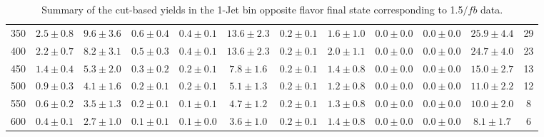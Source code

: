 \begin{table}
{\begin{center}
\begin{tabular}{l c c c c c c c c c c c }
350 & $2.5\pm0.8$ & $9.6\pm3.6$ & $0.6\pm0.4$ & $0.4\pm0.1$ & $13.6\pm2.3$ & $0.2\pm0.1$ & $1.6\pm1.0$ & $0.0\pm0.0$ & $0.0\pm0.0$ & $25.9\pm4.4$ & 29 \\
400 & $2.2\pm0.7$ & $8.2\pm3.1$ & $0.5\pm0.3$ & $0.4\pm0.1$ & $13.6\pm2.3$ & $0.2\pm0.1$ & $2.0\pm1.1$ & $0.0\pm0.0$ & $0.0\pm0.0$ & $24.7\pm4.0$ & 23 \\
450 & $1.4\pm0.4$ & $5.3\pm2.0$ & $0.3\pm0.2$ & $0.2\pm0.1$ & $7.8\pm1.6$ & $0.2\pm0.1$ & $1.4\pm0.8$ & $0.0\pm0.0$ & $0.0\pm0.0$ & $15.0\pm2.7$ & 13 \\
500 & $0.9\pm0.3$ & $4.1\pm1.6$ & $0.2\pm0.1$ & $0.2\pm0.1$ & $5.1\pm1.3$ & $0.2\pm0.1$ & $1.2\pm0.8$ & $0.0\pm0.0$ & $0.0\pm0.0$ & $11.0\pm2.2$ & 12 \\
550 & $0.6\pm0.2$ & $3.5\pm1.3$ & $0.2\pm0.1$ & $0.1\pm0.1$ & $4.7\pm1.2$ & $0.2\pm0.1$ & $1.3\pm0.8$ & $0.0\pm0.0$ & $0.0\pm0.0$ & $10.0\pm2.0$ & 8 \\
600 & $0.4\pm0.1$ & $2.7\pm1.0$ & $0.1\pm0.1$ & $0.1\pm0.0$ & $3.6\pm1.0$ & $0.2\pm0.1$ & $1.4\pm0.8$ & $0.0\pm0.0$ & $0.0\pm0.0$ & $8.1\pm1.7$ & 6 \\
\hline
\end{tabular}
\end{center}
}
\caption{Summary of the cut-based yields in the 1-Jet bin opposite flavor final state corresponding to 1.5$/fb$ data.}
\end{table}
